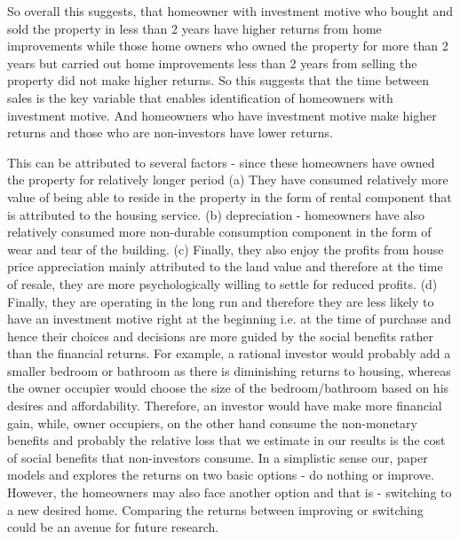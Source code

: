 \documentclass{article}
\begin{document}
So overall this suggests, that homeowner with investment motive who bought and sold the property in less than 2 years have higher returns from home improvements while those home owners who owned the property for more than 2 years but carried out home improvements less than 2 years from selling the property did not make higher returns. So this suggests that the time between sales is the key variable that enables identification of homeowners with investment motive. And homeowners who have investment motive make higher returns and those who are non-investors have lower returns. 

This can be attributed to several factors - since these homeowners have owned the property for relatively longer period (a) They have consumed relatively more value of being able to reside in the property in the form of rental component that is attributed to the housing service. (b) depreciation - homeowners have also relatively consumed more non-durable consumption component in the form of wear and tear of the building. (c) Finally, they also enjoy the profits from house price appreciation mainly attributed to the land value and therefore at the time of resale, they are more psychologically willing to settle for reduced profits.
(d) Finally, they are operating in the long run and therefore they are less likely to have an investment motive right at the beginning i.e. at the time of purchase and hence their choices and decisions are more guided by the social benefits rather than the financial returns. For example, a rational investor would probably add a smaller bedroom or bathroom as there is diminishing returns to housing, whereas the owner occupier would choose the size of the bedroom/bathroom based on his desires and affordability. Therefore, an investor would have make more financial gain, while, owner occupiers, on the other hand consume the non-monetary benefits and probably the relative loss that we estimate in our results is the cost of social benefits that non-investors consume. In a simplistic sense our, paper models and explores the returns on two basic options - do nothing or improve. However, the homeowners may also face another option and that is - switching to a new desired home. Comparing the returns between improving or switching could be an avenue for future research.
\end{document}
